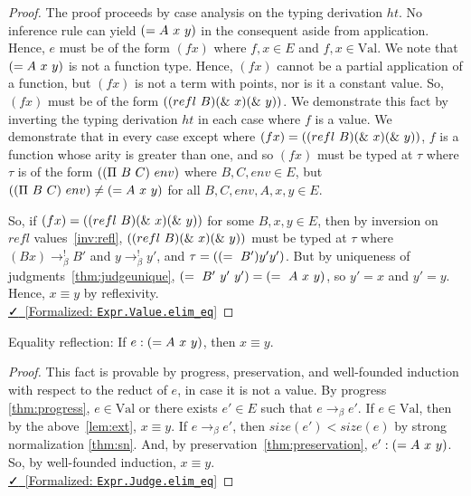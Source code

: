 \documentclass{lmcs}
\newcommand{\val}{\text{Val}}
\newcommand{\leanlink}[2]{
  \href{#1}{\textcolor{black}\faCheck~[Formalized: \texttt{#2}]}%
}
\newcommand{\arr}{\rightarrow}
\newcommand{\barr}{\arr_{\beta}}
\begin{document}
\begin{proof}
  The proof proceeds by case analysis on the typing derivation \(ht\). No inference rule can yield \(\comb[= A][x][y]\) in the consequent aside from application. Hence, \(e\) must be of the form \((f x)\) where \(f, x \in E\) and \(f, x \in \val\). We note that \(\comb[= A][x][y]\) is not a function type. Hence, \((f x)\) cannot be a partial application of a function, but \((f x)\) is not a term with points, nor is it a constant value. So, \((f x)\) must be of the form \((\comb[refl][B] \comb[\&][x] \comb[\&][y])\). We demonstrate this fact by inverting the typing derivation \(ht\) in each case where \(f\) is a value. We demonstrate that in every case except where \((f x) = (\comb[refl][B] \comb[\&][x] \comb[\&][y])\), \(f\) is a function whose arity is greater than one, and so \((f x)\) must be typed at \(\tau\) where \(\tau\) is of the form \((\comb[\Pi][B][C]\ env)\) where \(B, C, env \in E\), but \((\comb[\Pi][B][C]\ env) \neq \comb[= A][x][y]\) for all \(B, C, env, A, x, y \in E\).

  So, if \((f x) = (\comb[refl][B] \comb[\&][x] \comb[\&][y])\) for some \(B, x, y \in E\), then by inversion on \(refl\) values~\ref{inv:refl}, \((\comb[refl][B] \comb[\&][x] \comb[\&][y])\) must be typed at \(\tau\) where \((B x) \barr^{!} B'\) and \(y \barr^{!} y'\), and \(\tau = (\comb[=][B'] y' y')\). But by uniqueness of judgments~\ref{thm:judgeunique}, \(\comb[=][B'][y'][y'] = \comb[=][A][x][y]\), so \(y' = x\) and \(y' = y\). Hence, \(x \equiv y\) by reflexivity.\\
\noindent \leanlink{https://github.com/lexzaiello/DCC/blob/4b0ea7f932ae69ac6d11658d69d3dcc0c261f4e7/Dcc/Metatheory/Extensional.lean\#L9}{Expr.Value.elim\_eq}
\end{proof}

\begin{thm}
  Equality reflection: If \(e : \comb[= A][x][y]\), then \(x \equiv y\).
\end{thm}

\begin{proof}
  This fact is provable by progress, preservation, and well-founded induction with respect to the reduct of \(e\), in case it is not a value. By progress \ref{thm:progress}, \(e \in \val\) or there exists \(e' \in E\) such that \(e \barr e'\). If \(e \in \val\), then by the above~\ref{lem:ext}, \(x \equiv y\). If \(e \barr e'\), then \(size(e') < size(e)\) by strong normalization \ref{thm:sn}. And, by preservation~\ref{thm:preservation}, \(e' : \comb[= A][x][y]\). So, by well-founded induction, \(x \equiv y\).\\
\noindent \leanlink{https://github.com/lexzaiello/DCC/blob/4b0ea7f932ae69ac6d11658d69d3dcc0c261f4e7/Dcc/Metatheory/Extensional.lean\#L122}{Expr.Judge.elim\_eq}
\end{proof}
\end{document}
